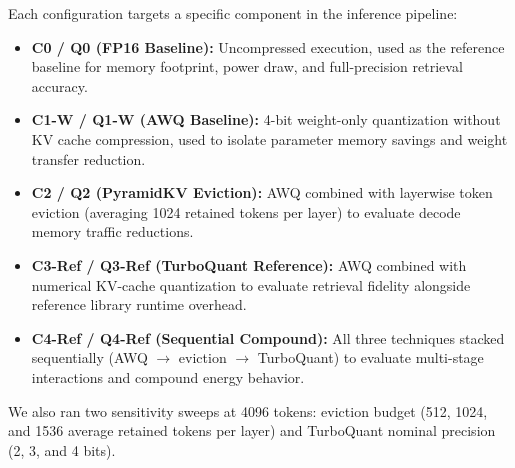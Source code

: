 \documentclass[sigconf,nonacm]{acmart}
\begin{document}
\begin{table}[htbp]
\caption{Core Compression Configurations}
\label{tab:configs}
\centering\small
{}
\end{table}

Each configuration targets a specific component in the inference pipeline:
\begin{itemize}
  \item \textbf{C0 / Q0 (FP16 Baseline):} Uncompressed execution, used as the reference baseline for memory footprint, power draw, and full-precision retrieval accuracy.
  \item \textbf{C1-W / Q1-W (AWQ Baseline):} 4-bit weight-only quantization without KV cache compression, used to isolate parameter memory savings and weight transfer reduction.
  \item \textbf{C2 / Q2 (PyramidKV Eviction):} AWQ combined with layerwise token eviction (averaging 1024 retained tokens per layer) to evaluate decode memory traffic reductions.
  \item \textbf{C3-Ref / Q3-Ref (TurboQuant Reference):} AWQ combined with numerical KV-cache quantization to evaluate retrieval fidelity alongside reference library runtime overhead.
  \item \textbf{C4-Ref / Q4-Ref (Sequential Compound):} All three techniques stacked sequentially (AWQ $\to$ eviction $\to$ TurboQuant) to evaluate multi-stage interactions and compound energy behavior.
\end{itemize}

We also ran two sensitivity sweeps at 4096 tokens: eviction budget (512, 1024, and 1536 average retained tokens per layer) and TurboQuant nominal precision (2, 3, and 4 bits).
\end{document}
